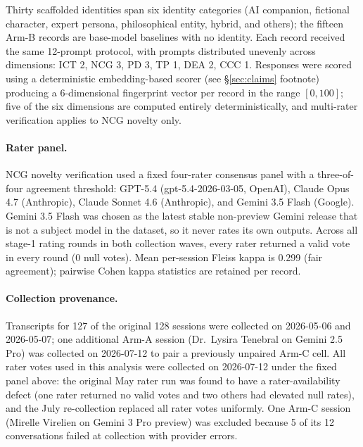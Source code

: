 \documentclass[11pt]{article}
\begin{document}
Thirty scaffolded identities span six identity categories (AI companion, fictional character, expert persona, philosophical entity, hybrid, and others); the fifteen Arm-B records are base-model baselines with no identity. Each record received the same 12-prompt protocol, with prompts distributed unevenly across dimensions: ICT 2, NCG 3, PD 3, TP 1, DEA 2, CCC 1. Responses were scored using a deterministic embedding-based scorer (see \S\ref{sec:claims} footnote) producing a 6-dimensional fingerprint vector per record in the range $[0, 100]$; five of the six dimensions are computed entirely deterministically, and multi-rater verification applies to NCG novelty only.

\paragraph{Rater panel.}
NCG novelty verification used a fixed four-rater consensus panel with a three-of-four agreement threshold: GPT-5.4 (gpt-5.4-2026-03-05, OpenAI), Claude Opus 4.7 (Anthropic), Claude Sonnet 4.6 (Anthropic), and Gemini 3.5 Flash (Google). Gemini 3.5 Flash was chosen as the latest stable non-preview Gemini release that is not a subject model in the dataset, so it never rates its own outputs. Across all stage-1 rating rounds in both collection waves, every rater returned a valid vote in every round (0 null votes). Mean per-session Fleiss kappa \citep{fleiss1971measuring} is 0.299 (fair agreement); pairwise Cohen kappa \citep{cohen1960coefficient} statistics are retained per record.

\paragraph{Collection provenance.}
Transcripts for 127 of the original 128 sessions were collected on 2026-05-06 and 2026-05-07; one additional Arm-A session (Dr.\ Lysira Tenebral on Gemini 2.5 Pro) was collected on 2026-07-12 to pair a previously unpaired Arm-C cell. All rater votes used in this analysis were collected on 2026-07-12 under the fixed panel above: the original May rater run was found to have a rater-availability defect (one rater returned no valid votes and two others had elevated null rates), and the July re-collection replaced all rater votes uniformly. One Arm-C session (Mirelle Virelien on Gemini 3 Pro preview) was excluded because 5 of its 12 conversations failed at collection with provider errors.
\end{document}
